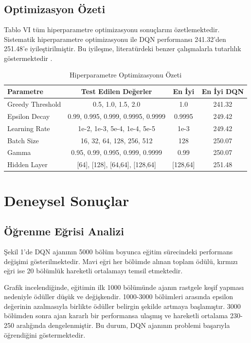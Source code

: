 \documentclass[onecolumn]{IEEEtran}
\begin{document}
\subsection{Optimizasyon Özeti}

Tablo VI tüm hiperparametre optimizasyonu sonuçlarını özetlemektedir. Sistematik hiperparametre optimizasyonu ile DQN performansı 241.32'den 251.48'e iyileştirilmiştir. Bu iyileşme, literatürdeki benzer çalışmalarla tutarlılık göstermektedir \cite{li2026deep, dai2025djaya}.

\begin{table}[h]
\centering
\caption{Hiperparametre Optimizasyonu Özeti}
\begin{tabular}{lccc}
\toprule
\textbf{Parametre} & \textbf{Test Edilen Değerler} & \textbf{En İyi} & \textbf{En İyi DQN} \\
\midrule
Greedy Threshold & 0.5, 1.0, 1.5, 2.0 & 1.0 & 241.32 \\
Epsilon Decay & 0.99, 0.995, 0.999, 0.9995, 0.9999 & 0.9995 & 249.42 \\
Learning Rate & 1e-2, 1e-3, 5e-4, 1e-4, 5e-5 & 1e-3 & 249.42 \\
Batch Size & 16, 32, 64, 128, 256, 512 & 128 & 250.07 \\
Gamma & 0.95, 0.99, 0.995, 0.999, 0.9999 & 0.99 & 250.07 \\
Hidden Layer & {[64]}, {[128]}, {[64,64]}, {[128,64]} & {[128,64]} & 251.48 \\
\bottomrule
\end{tabular}
\label{tab:summary}
\end{table}

\section{Deneysel Sonuçlar}

\subsection{Öğrenme Eğrisi Analizi}

Şekil 1'de DQN ajanının 5000 bölüm boyunca eğitim sürecindeki performans değişimi gösterilmektedir. Mavi eğri her bölümde alınan toplam ödülü, kırmızı eğri ise 20 bölümlük hareketli ortalamayı temsil etmektedir.

Grafik incelendiğinde, eğitimin ilk 1000 bölümünde ajanın rastgele keşif yapması nedeniyle ödüller düşük ve değişkendir. 1000-3000 bölümleri arasında epsilon değerinin azalmasıyla birlikte ödüller belirgin şekilde artmaya başlamıştır. 3000 bölümden sonra ajan kararlı bir performansa ulaşmış ve hareketli ortalama 230-250 aralığında dengelenmiştir. Bu durum, DQN ajanının problemi başarıyla öğrendiğini göstermektedir.
\end{document}
